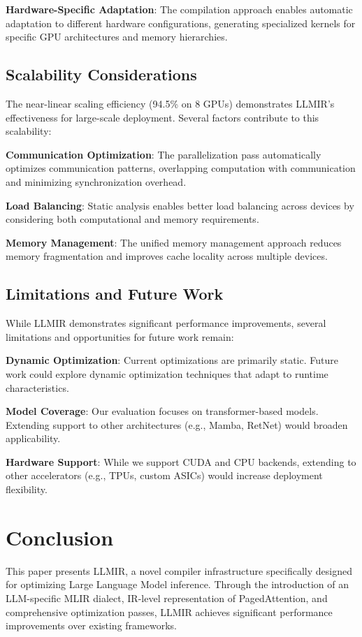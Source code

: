 \documentclass[conference]{IEEEtran}
\begin{document}
\textbf{Hardware-Specific Adaptation}: The compilation approach enables automatic adaptation to different hardware configurations, generating specialized kernels for specific GPU architectures and memory hierarchies.

\subsection{Scalability Considerations}

The near-linear scaling efficiency (94.5\% on 8 GPUs) demonstrates LLMIR's effectiveness for large-scale deployment. Several factors contribute to this scalability:

\textbf{Communication Optimization}: The parallelization pass automatically optimizes communication patterns, overlapping computation with communication and minimizing synchronization overhead.

\textbf{Load Balancing}: Static analysis enables better load balancing across devices by considering both computational and memory requirements.

\textbf{Memory Management}: The unified memory management approach reduces memory fragmentation and improves cache locality across multiple devices.

\subsection{Limitations and Future Work}

While LLMIR demonstrates significant performance improvements, several limitations and opportunities for future work remain:

\textbf{Dynamic Optimization}: Current optimizations are primarily static. Future work could explore dynamic optimization techniques that adapt to runtime characteristics.

\textbf{Model Coverage}: Our evaluation focuses on transformer-based models. Extending support to other architectures (e.g., Mamba, RetNet) would broaden applicability.

\textbf{Hardware Support}: While we support CUDA and CPU backends, extending to other accelerators (e.g., TPUs, custom ASICs) would increase deployment flexibility.

\section{Conclusion}

This paper presents LLMIR, a novel compiler infrastructure specifically designed for optimizing Large Language Model inference. Through the introduction of an LLM-specific MLIR dialect, IR-level representation of PagedAttention, and comprehensive optimization passes, LLMIR achieves significant performance improvements over existing frameworks.
\end{document}
